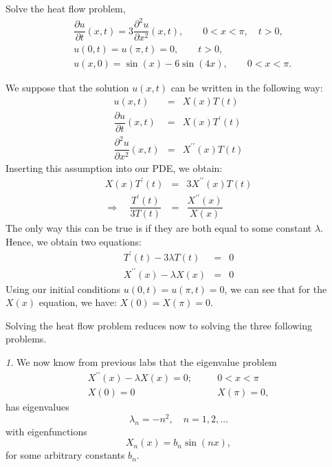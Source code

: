 \documentclass[11pt]{article}
\begin{document}
\begin{problem}
Solve the heat flow problem,
\begin{equation*} \begin{split}
& \dfrac{\partial u }{\partial t } (x,t) = 3 \dfrac{\partial^2 u}{\partial x^2}(x,t), \qquad 0<x<\pi, \quad t>0, \\
& u(0,t) = u(\pi,t)=0, \qquad t>0, \\
& u(x,0) = \sin(x)-6 \sin(4x), \qquad 0<x<\pi.
\end{split}\end{equation*}
\end{problem}

\begin{solution}
We suppose that the solution $u(x,t)$ can be written in the following way:
\begin{eqnarray*}
u(x,t) & = & X(x)T(t)\\
\dfrac{\partial u }{\partial t }(x,t) & = & X(x)T^{\prime}(t) \\
\dfrac{\partial^2 u}{\partial x^2}(x,t) & = & X^{\prime \prime}(x)T(t)
\end{eqnarray*}
Inserting this assumption into our PDE, we obtain:
\begin{eqnarray*}
X(x)T^{\prime}(t) & = & 3 X^{\prime \prime}(x)T(t) \\
\Rightarrow \quad \dfrac{T^{\prime}(t)}{3T(t)} & = &  \dfrac{X^{\prime \prime}(x)}{X(x)}
\end{eqnarray*}
The only way this can be true is if they are both equal to some constant $\lambda$.
Hence, we obtain two equations:
\begin{eqnarray*}
T^{\prime}(t) - 3\lambda T(t) & = & 0\\
X^{\prime \prime}(x) - \lambda X(x) & = & 0
\end{eqnarray*}
Using our initial conditions $u(0,t)  =  u(\pi,t)=0$, we can see that for the $X(x)$ equation, we have: $X(0)=X(\pi)=0$.

Solving the heat flow problem reduces now to solving the three following problems.

\textsl{1.} We now know from previous labs that the eigenvalue problem
\begin{eqnarray*}
X^{\prime \prime}(x) - \lambda X(x) =0; & \quad & 0<x<\pi \\
X(0)=0 & \quad & X(\pi) =0,
\end{eqnarray*}
has eigenvalues $$\lambda_{n} = -n^2, \quad n = 1,2 , \dots$$ with eigenfunctions $$X_{n}(x) = b_{n} \sin(nx),$$ for some arbitrary constants $b_{n}$.


\end{solution}
\end{document}
